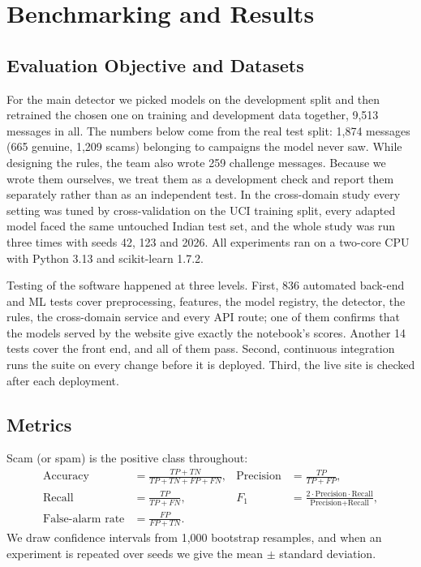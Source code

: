 \chapter{Benchmarking and Results}
\section{Evaluation Objective and Datasets}
For the main detector we picked models on the development split and then retrained the chosen one on training and development data together, 9,513 messages in all. The numbers below come from the real test split: 1,874 messages (665 genuine, 1,209 scams) belonging to campaigns the model never saw. While designing the rules, the team also wrote 259 challenge messages. Because we wrote them ourselves, we treat them as a development check and report them separately rather than as an independent test. In the cross-domain study every setting was tuned by cross-validation on the UCI training split, every adapted model faced the same untouched Indian test set, and the whole study was run three times with seeds 42, 123 and 2026. All experiments ran on a two-core CPU with Python 3.13 and scikit-learn 1.7.2.

Testing of the software happened at three levels. First, 836 automated back-end and ML tests cover preprocessing, features, the model registry, the detector, the rules, the cross-domain service and every API route; one of them confirms that the models served by the website give exactly the notebook's scores. Another 14 tests cover the front end, and all of them pass. Second, continuous integration runs the suite on every change before it is deployed. Third, the live site is checked after each deployment.

\section{Metrics}
Scam (or spam) is the positive class throughout:
\begin{align}
\text{Accuracy}&=\frac{TP+TN}{TP+TN+FP+FN}, & \text{Precision}&=\frac{TP}{TP+FP},\\
\text{Recall}&=\frac{TP}{TP+FN}, & F_1&=\frac{2\cdot\text{Precision}\cdot\text{Recall}}{\text{Precision}+\text{Recall}},\\
\text{False-alarm rate}&=\frac{FP}{FP+TN}. & &
\end{align}
We draw confidence intervals from 1,000 bootstrap resamples, and when an experiment is repeated over seeds we give the mean $\pm$ standard deviation.

